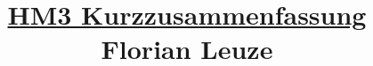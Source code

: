 \title{\underline{HM3 Kurzzusammenfassung} \\ $\;$ \\ $\;$ \\ Florian Leuze}
\date{}
\maketitle %

$\;$ \newline
$\;$ \newline
$\;$ \newline
$\;$ \newline
$\;$ \newline
$\;$ \newline
$\;$ \newline
$\;$ \newline
$\;$ \newline
$\;$ \newline
$\;$ \newline
$\;$ \newline